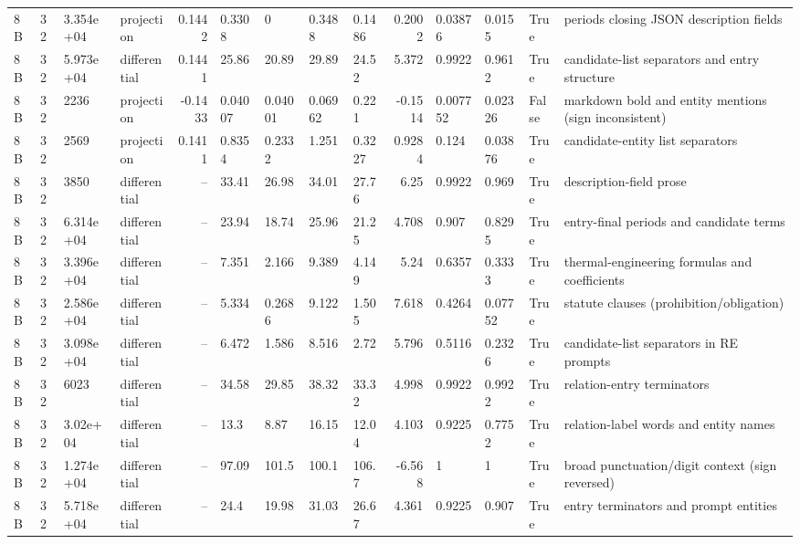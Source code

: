 \begin{tabular}{llllrllllrllll}
8B & 32 & 3.354e+04 & projection & 0.1442 & 0.3308 & 0 & 0.3488 & 0.1486 & 0.2002 & 0.03876 & 0.0155 & True & periods closing JSON description fields \\
8B & 32 & 5.973e+04 & differential & 0.1441 & 25.86 & 20.89 & 29.89 & 24.52 & 5.372 & 0.9922 & 0.9612 & True & candidate-list separators and entry structure \\
8B & 32 & 2236 & projection & -0.1433 & 0.04007 & 0.04001 & 0.06962 & 0.221 & -0.1514 & 0.007752 & 0.02326 & False & markdown bold and entity mentions (sign inconsistent) \\
8B & 32 & 2569 & projection & 0.1411 & 0.8354 & 0.2332 & 1.251 & 0.3227 & 0.9284 & 0.124 & 0.03876 & True & candidate-entity list separators \\
8B & 32 & 3850 & differential & -- & 33.41 & 26.98 & 34.01 & 27.76 & 6.25 & 0.9922 & 0.969 & True & description-field prose \\
8B & 32 & 6.314e+04 & differential & -- & 23.94 & 18.74 & 25.96 & 21.25 & 4.708 & 0.907 & 0.8295 & True & entry-final periods and candidate terms \\
8B & 32 & 3.396e+04 & differential & -- & 7.351 & 2.166 & 9.389 & 4.149 & 5.24 & 0.6357 & 0.3333 & True & thermal-engineering formulas and coefficients \\
8B & 32 & 2.586e+04 & differential & -- & 5.334 & 0.2686 & 9.122 & 1.505 & 7.618 & 0.4264 & 0.07752 & True & statute clauses (prohibition/obligation) \\
8B & 32 & 3.098e+04 & differential & -- & 6.472 & 1.586 & 8.516 & 2.72 & 5.796 & 0.5116 & 0.2326 & True & candidate-list separators in RE prompts \\
8B & 32 & 6023 & differential & -- & 34.58 & 29.85 & 38.32 & 33.32 & 4.998 & 0.9922 & 0.9922 & True & relation-entry terminators \\
8B & 32 & 3.02e+04 & differential & -- & 13.3 & 8.87 & 16.15 & 12.04 & 4.103 & 0.9225 & 0.7752 & True & relation-label words and entity names \\
8B & 32 & 1.274e+04 & differential & -- & 97.09 & 101.5 & 100.1 & 106.7 & -6.568 & 1 & 1 & True & broad punctuation/digit context (sign reversed) \\
8B & 32 & 5.718e+04 & differential & -- & 24.4 & 19.98 & 31.03 & 26.67 & 4.361 & 0.9225 & 0.907 & True & entry terminators and prompt entities \\
\bottomrule
\end{tabular}
